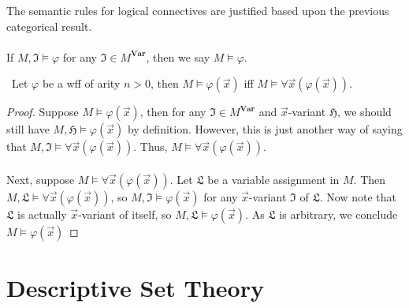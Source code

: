 \documentclass{treatise}
\begin{document}
\begin{shaded}
\begin{enumerate}
\end{enumerate}
The semantic rules for logical connectives are justified based upon the previous categorical result.
\\
\\
If $M, \mathfrak{I} \vDash \varphi$ for any $\mathfrak{I} \in M^{\mathbf{Var}}$, then we say $M \vDash \varphi$.
\begin{theorem} \ 
Let $\varphi$ be a wff of arity $n > 0$, then $M \vDash \varphi(\vec{x})$ iff $M \vDash \forall \vec{x} (\varphi(\vec{x}))$.
\end{theorem}
\begin{proof}
Suppose $M \vDash \varphi(\vec{x})$, then for any $\mathfrak{I} \in M^{\mathbf{Var}}$ and $\vec{x}$-variant $\mathfrak{H}$, we should still have $M, \mathfrak{H} \vDash \varphi(\vec{x})$ by definition. However, this is just another way of saying that $M, \mathfrak{I} \vDash \forall \vec{x} (\varphi(\vec{x}))$. Thus, $M \vDash \forall \vec{x} (\varphi(\vec{x}))$.
\\
\\
Next, suppose $M \vDash \forall \vec{x} (\varphi(\vec{x}))$. Let $\mathfrak{L}$ be a variable assignment in $M$. Then $M, \mathfrak{L} \vDash \forall \vec{x} (\varphi(\vec{x}))$, so $M, \mathfrak{I} \vDash \varphi(\vec{x})$ for any $\vec{x}$-variant $\mathfrak{I}$ of $\mathfrak{L}$. Now note that $\mathfrak{L}$ is actually $\vec{x}$-variant of itself, so $M, \mathfrak{L} \vDash \varphi(\vec{x})$. As $\mathfrak{L}$ is arbitrary, we conclude $M \vDash \varphi(\vec{x})$
\end{proof}

\newpage
\newpage

\chapter{Descriptive Set Theory}

\end{shaded}
\end{document}
